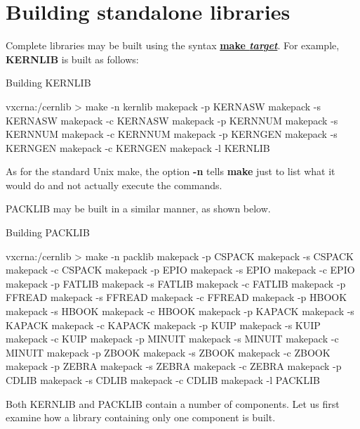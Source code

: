 \section{Building standalone libraries}

Complete libraries may be built using the syntax {\underline {\bf make {\it target}}}.
For example, {\bf KERNLIB} is built as follows:

\begin{XMPt}{Building KERNLIB}

vxcrna:/cernlib > make -n kernlib
        makepack -p KERNASW 
        makepack -s KERNASW 
        makepack -c KERNASW 
        makepack -p KERNNUM 
        makepack -s KERNNUM 
        makepack -c KERNNUM 
        makepack -p KERNGEN 
        makepack -s KERNGEN 
        makepack -c KERNGEN 
        makepack -l KERNLIB

\end{XMPt}

As for the standard Unix make, the option {\bf -n} tells {\bf make}
just to list what it would do and not actually execute the commands.

PACKLIB may be built in a similar manner, as shown below.

\begin{XMPt}{Building PACKLIB}

vxcrna:/cernlib > make -n packlib
        makepack -p CSPACK  
        makepack -s CSPACK  
        makepack -c CSPACK  
        makepack -p EPIO    
        makepack -s EPIO    
        makepack -c EPIO    
        makepack -p FATLIB  
        makepack -s FATLIB  
        makepack -c FATLIB  
        makepack -p FFREAD  
        makepack -s FFREAD  
        makepack -c FFREAD  
        makepack -p HBOOK   
        makepack -s HBOOK   
        makepack -c HBOOK   
        makepack -p KAPACK  
        makepack -s KAPACK  
        makepack -c KAPACK  
        makepack -p KUIP    
        makepack -s KUIP    
        makepack -c KUIP    
        makepack -p MINUIT  
        makepack -s MINUIT  
        makepack -c MINUIT  
        makepack -p ZBOOK   
        makepack -s ZBOOK   
        makepack -c ZBOOK   
        makepack -p ZEBRA   
        makepack -s ZEBRA   
        makepack -c ZEBRA   
        makepack -p CDLIB   
        makepack -s CDLIB   
        makepack -c CDLIB   
        makepack -l PACKLIB

\end{XMPt}

Both KERNLIB and PACKLIB contain a number of components. Let us first
examine how a library containing only one component is built.

